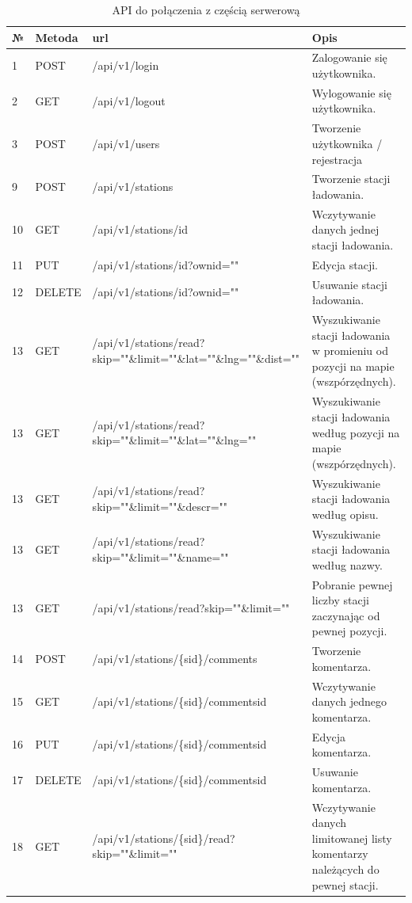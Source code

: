 \begin{table}[htb] \small
    \caption{API do połączenia z częścią serwerową }
    \label{tab:endpoints_front}
    \begin{tabularx}{\linewidth}{| m{0.45cm} | m{1.5cm} | m{6cm} | X |}
    \hline
    № & Metoda & url & Opis \\
    \hline
    1 & POST & /api/v1/login & Zalogowanie się użytkownika. \\
    \hline
    2 & GET & /api/v1/logout & Wylogowanie się użytkownika. \\
    \hline
    3 & POST & /api/v1/users & Tworzenie użytkownika / rejestracja \\
    \hline
    9 & POST & /api/v1/stations & Tworzenie stacji ładowania. \\
    \hline
    10 & GET & /api/v1/stations/{id} & Wczytywanie danych jednej stacji ładowania. \\
    \hline
    11 & PUT & /api/v1/stations/{id}?ownid="" & Edycja stacji. \\
    \hline
    12 & DELETE & /api/v1/stations/{id}?ownid="" & Usuwanie stacji ładowania. \\
    \hline
    13 & GET & /api/v1/stations/read?skip=""\&limit=""\&lat=""\&lng=""\&dist="" & Wyszukiwanie stacji ładowania w promieniu od pozycji na mapie (wszpórzędnych). \\
    \hline
    13 & GET & /api/v1/stations/read?skip=""\&limit=""\&lat=""\&lng="" & Wyszukiwanie stacji ładowania według pozycji na mapie (wszpórzędnych). \\
    \hline
    13 & GET & /api/v1/stations/read?skip=""\&limit=""\&descr="" & Wyszukiwanie stacji ładowania według opisu. \\
    \hline
    13 & GET & /api/v1/stations/read?skip=""\&limit=""\&name="" & Wyszukiwanie stacji ładowania według nazwy. \\
    \hline
    13 & GET & /api/v1/stations/read?skip=""\&limit="" & Pobranie pewnej liczby stacji zaczynając od pewnej pozycji. \\
    \hline
    14 & POST & /api/v1/stations/\{sid\}/comments & Tworzenie komentarza. \\
    \hline
    15 & GET & /api/v1/stations/\{sid\}/comments{id} & Wczytywanie danych jednego komentarza. \\
    \hline
    16 & PUT & /api/v1/stations/\{sid\}/comments{id} & Edycja komentarza. \\
    \hline
    17 & DELETE & /api/v1/stations/\{sid\}/comments{id} & Usuwanie komentarza. \\
    \hline
    18 & GET & /api/v1/stations/\{sid\}/read?skip=""\&limit="" & Wczytywanie danych limitowanej listy komentarzy należących do pewnej stacji. \\
    \hline
    \end{tabularx}
\end{table}

